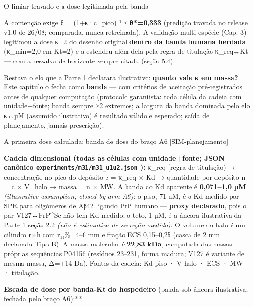 \documentclass[12pt,a4paper,oneside]{report}
\begin{document}
O limiar travado e a dose legitimada pela banda

A contenção exige θ = (1+κ·c\_pico)⁻¹ ≤ \textbf{θ*=0,333} (predição
travada no release v1.0 de 26/08; comparada, nunca retreinada). A
validação multi-espécie (Cap. 3) legitimou a dose κ=2 do desenho
original \textbf{dentro da banda humana herdada} (κ\_min=2,0 em Kt=2) e
a estendeu além dela pela regra de titulação κ\_req↔Kt --- com a
ressalva de horizonte sempre citada (seção 5.4).

Restava o elo que a Parte 1 declarara ilustrativo: \textbf{quanto vale κ
em massa?} Este capítulo o fecha como \textbf{banda} --- com critérios
de aceitação pré-registrados antes de qualquer computação (protocolo
garantista: toda célula da cadeia com unidade+fonte; banda sempre ≥2
extremos; a largura da banda dominada pelo elo κ↔µM (assumido
ilustrativo) é resultado válido e esperado; saída de planejamento,
jamais prescrição).

A primeira dose calculada: banda de dose do braço A6
{[}SIM-planejamento{]}

\textbf{Cadeia dimensional (todas as células com unidade+fonte; JSON
canônico \texttt{experiments/m31/m31\_u1u2.json} \cite{e58}):} κ\_req
(regra de titulação) → concentração no pico do depósito c = κ\_req × Kd
→ quantidade por depósito n = c × V\_halo → massa = n × MW. A banda do
Kd aparente é \textbf{0,071--1,0 µM} \emph{(illustrative assumption;
closed by arm A6)}: o piso, 71 nM, é o Kd medido por SPR para oligômeros
de Aβ42 ligando PrP humano \cite{e57} --- \textbf{proxy declarado}, pois
o par V127↔PrP\^{}Sc não tem Kd medido; o teto, 1 µM, é a âncora
ilustrativa da Parte 1 seção 2.2 \emph{(não é estimativa de secreção
medida)}. O volume do halo é um cilindro r×h com r₁₀\%=4--6 mm e fração
ECS 0,15--0,25 (casca de 2 mm declarada Tipo-B). A massa molecular é
\textbf{22,83 kDa}, computada das nossas próprias sequências P04156
(resíduos 23--231, forma madura; V127 é variante de mesma massa, Δ=+14
Da). Fontes da cadeia: Kd-piso · V-halo · ECS · MW · titulação.

\textbf{Escada de dose por banda-Kt do hospedeiro} (banda sob âncora
ilustrativa; fechada pelo braço A6):**
\end{document}
